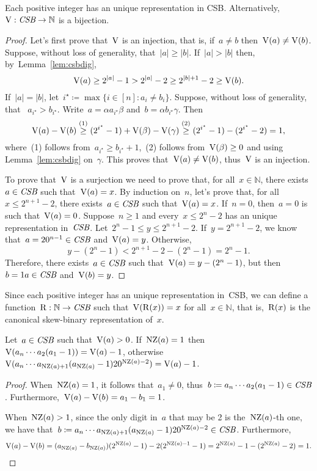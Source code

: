 \documentclass[main.tex]{subfiles}
\begin{document}
\begin{theorem} \label{thm:csbbij}
    Each positive integer has an unique representation in CSB. Alternatively,~${\operatorname{V}: \textit{CSB} \rightarrow \mathbb{N}}$ is a bijection.
\end{theorem}
\begin{proof}
    Let's first prove that~$\operatorname{V}$ is an injection, that is, if~${a \neq b}$ then~${\operatorname{V}(a) \neq \operatorname{V}(b)}$. Suppose, without loss of generality, that~$|a| \geq |b|$. If~$|a| > |b|$ then, by~Lemma~\ref{lem:csbdig},
	$$ \operatorname{V}(a) \geq 2^{|a|} - 1 > 2^{|a|} - 2 \geq 2^{|b| + 1} - 2 \geq \operatorname{V}(b). $$
    If~$|a| = |b|$, let~${i^\star \coloneqq \max\{i \in [n] : a_i \neq b_i\}}$. Suppose, without loss of generality, that ~${a_{i^\star} > b_{i^\star}}$. Write~${a = \alpha a_{i^\star} \beta}$ and~${b = \alpha b_{i^\star} \gamma}$. Then
	$$ \operatorname{V}(a) - \operatorname{V}(b) \stackrel{\text{(1)}}{\geq} (2^{i^\star} - 1) + \operatorname{V}(\beta) - \operatorname{V}(\gamma) \stackrel{\text{(2)}}{\geq} (2^{i^\star} - 1) - (2^{i^\star} - 2) = 1, $$
	where~(1) follows from~$a_{i^\star} \geq b_{i^\star} + 1$,~(2) follows from~$\operatorname{V}(\beta) \geq 0$ and using Lemma~\ref{lem:csbdig} on~$\gamma$. This proves that~$\operatorname{V}(a) \neq \operatorname{V}(b)$, thus~$\operatorname{V}$ is an injection.

    To prove that~$\operatorname{V}$ is a surjection we need to prove that, for all~$x \in \mathbb{N}$, there exists~${a \in \textit{CSB}}$ such that~${\operatorname{V}(a) = x}$. By induction on~$n$, let's prove that, for all~${x \leq 2^{n+1} - 2}$, there exists~${a \in \textit{CSB}}$ such that~${\operatorname{V}(a) = x}$. If~$n = 0$, then~$a = 0$ is such that~$\operatorname{V}(a) = 0$. Suppose~$n \geq 1$ and every~${x \leq 2^n - 2}$ has an unique representation in~$\textit{CSB}$. Let~${2^n - 1 \leq y \leq 2^{n+1} - 2}$. If~$y = 2^{n+1} - 2$, we know that~${a = 20^{n-1} \in \textit{CSB}}$ and~$\operatorname{V}(a) = y$. Otherwise,
	$$y - (2^n - 1) < 2^{n+1} - 2 - (2^n - 1) = 2^n - 1.$$
    Therefore, there exists~$a \in \textit{CSB}$ such that~${\operatorname{V}(a) = y - (2^n - 1)}$, but then~$b = 1a \in \textit{CSB}$ and~$\operatorname{V}(b) = y$.
\end{proof}

Since each positive integer has an unique representation in~CSB, we can define a function~${\operatorname{R}: \mathbb{N} \rightarrow \textit{CSB}}$ such that~$\operatorname{V}(\operatorname{R}(x)) = x$ for all~$x \in \mathbb{N}$, that is,~$\operatorname{R}(x)$ is the canonical skew-binary representation of~$x$.


\begin{lemma} \label{lem:csbsub}
    Let~$a \in \textit{CSB}$ such that~$\operatorname{V}(a) > 0$. If~$\operatorname{NZ}(a) = 1$ then~$\operatorname{V}(a_n \cdots a_2 (a_1-1)) = \operatorname{V}(a) - 1$, otherwise~${\operatorname{V}(a_n \cdots a_{\operatorname{NZ}(a)+1} (a_{\operatorname{NZ}(a)} - 1) 2 0^{\operatorname{NZ}(a) - 2}) = \operatorname{V}(a) - 1}$.
\end{lemma}
\begin{proof}
    When~$\operatorname{NZ}(a) = 1$, it follows that~$a_1 \neq 0$, thus~${b \coloneqq a_n \cdots a_2 (a_1-1) \in \textit{CSB}}$. Furthermore,~${\operatorname{V}(a) - \operatorname{V}(b) = a_1 - b_1 = 1}$.

    When~$\operatorname{NZ}(a) > 1$, since the only digit in~$a$ that may be 2 is the~$\operatorname{NZ}(a)$-th one, we have that~${b \coloneqq a_n \cdots a_{\operatorname{NZ}(a)+1} (a_{\operatorname{NZ}(a)} - 1) 2 0^{\operatorname{NZ}(a) - 2} \in \textit{CSB}}$. Furthermore,
	$$ \operatorname{V}(a) - \operatorname{V}(b) = (a_{\operatorname{NZ}(a)} - b_{\operatorname{NZ}(a)}) (2^{\operatorname{NZ}(a)} - 1) - 2 (2^{\operatorname{NZ}(a) - 1} - 1) = 2^{\operatorname{NZ}(a)} - 1 - (2^{\operatorname{NZ}(a)} - 2) = 1. $$
\end{proof}
\end{document}
